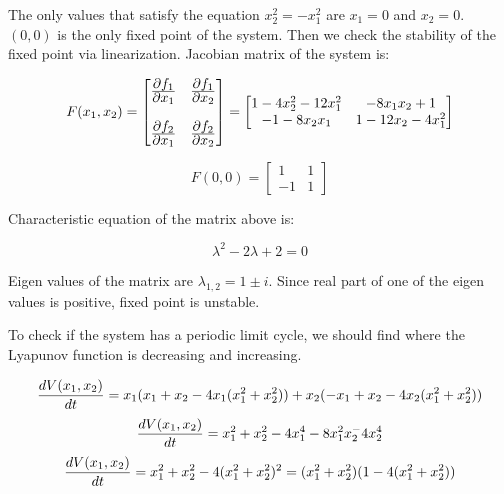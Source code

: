 \documentclass[12pt,a4paper, margin=1in]{article}
\begin{document}
\begin{enumerate}
        The only values that satisfy the equation $x_2^2 = -x_1^2$ are $x_1=0$ and $x_2=0$.
         $(0,0)$ is the only fixed point of the system.
        Then we check the stability of the fixed point via linearization. Jacobian matrix of the system is:

        \begin{equation*}
            F(x_1, x_2) = \begin{bmatrix}
                \frac{\displaystyle \partial f_1}{\displaystyle \partial x_1} & \frac{\displaystyle \partial f_1}{\displaystyle \partial x_2} \\ \\
                \frac{\displaystyle \partial f_2}{\displaystyle \partial x_1} & \frac{\displaystyle \partial f_2}{\displaystyle \partial x_2} 
            \end{bmatrix} = \begin{bmatrix} 
                1-4x_2^2 - 12x_1^2 & -8x_1x_2 + 1 \\
                -1-8x_2x_1 & 1-12x_2-4x_1^2
            \end{bmatrix}
        \end{equation*}

        \begin{equation*}
            F(0,0)=\begin{bmatrix}
                1 & 1 \\
                -1 & 1
            \end{bmatrix}
        \end{equation*}

        Characteristic equation of the matrix above is:

        \begin{equation*}
            \lambda^2 - 2\lambda +2 = 0
        \end{equation*}

        Eigen values of the matrix are $\lambda_{1,2} = 1 \pm i$. Since real part of one of the eigen values
        is positive, fixed point is unstable.
        
        To check if the system has a periodic limit cycle, we should find where the Lyapunov function is decreasing and increasing.

        \begin{equation*}
            \frac{\displaystyle dV(x_1,x_2)}{\displaystyle dt} = x_1(x_1+x_2-4x_1(x_1^2+x_2^2)) + 
            x_2(-x_1+x_2-4x_2(x_1^2+x_2^2))
        \end{equation*}
        \begin{equation*}
            \frac{\displaystyle dV(x_1,x_2)}{\displaystyle dt} = x_1^2+x_2^2 - 4x_1^4 - 8x_1^2x_2^ - 4x_2^4
        \end{equation*}
        \begin{equation*}
            \frac{\displaystyle dV(x_1,x_2)}{\displaystyle dt} = x_1^2+x_2^2 - 4(x_1^2+x_2^2)^2 = (x_1^2+x_2^2)(1-4(x_1^2+x_2^2))
        \end{equation*}
        

\end{enumerate}
\end{document}
